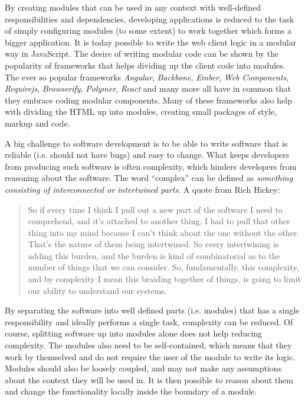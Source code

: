 \documentclass[a4paper,11pt]{kth-mag}
\begin{document}
        By creating modules that can be used in any context with well-defined responsibilities and dependencies, developing applications is reduced to the task of simply configuring modules (to some extent) to work together which forms a bigger application.
        It is today possible to write the \gls{web} client logic in a modular way in \gls{JavaScript}.
        The desire of writing modular code can be shown by the popularity of frameworks that helps dividing up the client code into modules.
        The ever so popular frameworks \emph{Angular}, \emph{Backbone}, \emph{Ember}, \emph{Web Components}, \emph{Requirejs}, \emph{Browserify}, \emph{Polymer}, \emph{React} and many more all have in common that they embrace coding modular components.
        Many of these frameworks also help with dividing the \gls{HTML} up into modules, creating small packages of style, markup and code.

        A big challenge to software development is to be able to write software that is reliable (i.e. should not have bugs) and easy to change.
        What keeps developers from producing such software is often complexity, which hinders developers from reasoning about the software.
        The word ``complex'' can be defined as \emph{something consisting of interconnected or intertwined parts}.
        A quote from Rich Hickey:
        \begin{quote}
          So if every time I think I pull out a new part of the software I need to comprehend, and it's attached to another thing, I had to pull that other thing into my mind because I can't think about the one without the other.
          That's the nature of them being intertwined. So every intertwining is adding this burden, and the burden is kind of combinatorial as to the number of things that we can consider.
          So, fundamentally, this complexity, and by complexity I mean this braiding together of things, is going to limit our ability to understand our systems.
        \end{quote}
        By separating the software into well defined parts (i.e. modules) that has a single responsibility and ideally performs a single task, complexity can be reduced.
        Of course, splitting software up into modules alone does not help reducing complexity.
        The modules also need to be self-contained, which means that they work by themselved and do not require the user of the module to write its logic.
        Modules should also be loosely coupled, and may not make any assumptions about the context they will be used in.
        It is then possible to reason about them and change the functionality locally inside the boundary of a module.
        
\end{document}
